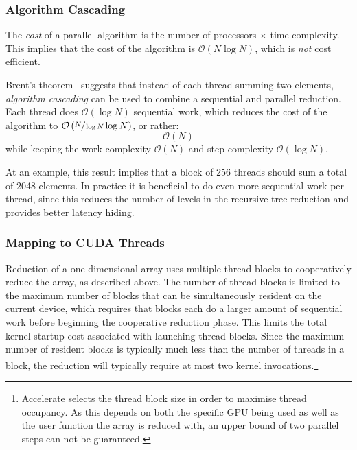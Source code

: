 \subsubsection{Algorithm Cascading}
\label{sec:algorithm_cascading}

The \emph{cost} of a parallel algorithm is the number of processors $\times$
time complexity. This implies that the cost of the algorithm is
$\mathcal{O}\left( N \log N \right)$, which is \emph{not} cost efficient.

Brent's theorem~\cite{Chatterjee:2009vh} suggests that instead of each thread
summing two elements, \emph{algorithm cascading} can be used to combine a
sequential and parallel reduction. Each thread does $\mathcal{O}\left( \log N
\right)$ sequential work, which reduces the cost of the algorithm to
$\mathcal{O}\left( \sfrac{N}{\log N} \log N \right)$, or rather:
\[
\mathcal{O}\left( N \right)
\]
while keeping the work complexity $\mathcal{O}\left( N \right)$ and step
complexity $\mathcal{O}\left( \log N \right)$.

At an example, this result implies that a block of 256 threads should sum a
total of 2048 elements. In practice it is beneficial to do even more sequential
work per thread, since this reduces the number of levels in the recursive tree
reduction and provides better latency hiding.


\subsubsection{Mapping to CUDA Threads}

Reduction of a one dimensional array uses multiple thread blocks to
cooperatively reduce the array, as described above. The number of thread blocks
is limited to the maximum number of blocks that can be simultaneously resident
on the current device, which requires that blocks each do a larger amount of
sequential work before beginning the cooperative reduction phase. This limits
the total kernel startup cost associated with launching thread blocks. Since the
maximum number of resident blocks is typically much less than the number of
threads in a block, the reduction will typically require at most two kernel
invocations.\footnote{Accelerate selects the thread block size in order to
maximise thread occupancy. As this depends on both the specific GPU being used
as well as the user function the array is reduced with, an upper bound of two
parallel steps can not be guaranteed.}

